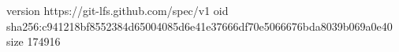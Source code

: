 version https://git-lfs.github.com/spec/v1
oid sha256:c941218bf8552384d65004085d6e41e37666df70e5066676bda8039b069a0e40
size 174916
